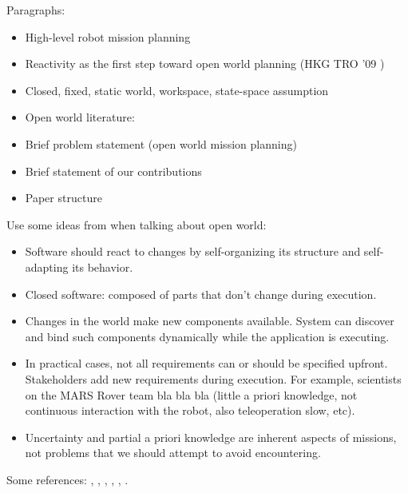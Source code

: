 Paragraphs:
\begin{itemize}
	\item High-level robot mission planning
	\item Reactivity as the first step toward open world planning (HKG TRO '09 \cite{KGFP_TRO09})
  	\item Closed, fixed, static world, workspace, state-space assumption
 	\item Open world literature: \cite{MatthiasAI2010}
	\item Brief problem statement (open world mission planning)
   	\item Brief statement of our contributions
   	\item Paper structure
\end{itemize}

Use some ideas from \cite{open-world-sw} when talking about open world:
\begin{itemize}
	\item Software should react to changes by self-organizing its structure and self-adapting its behavior.
	\item Closed software: composed of parts that don't change during execution.
	\item Changes in the world make new components available. System can discover and bind such components dynamically while the application is executing.
	\item In practical cases, not all requirements can or should be specified upfront. Stakeholders add new requirements during execution. For example, scientists on the MARS Rover team bla bla bla (little a priori knowledge, not continuous interaction with the robot, also teleoperation slow, etc).
	\item Uncertainty and partial a priori knowledge are inherent aspects of missions, not problems that we should attempt to avoid encountering.
\end{itemize}

Some references: \cite{MurrayICRA2012}, \cite{MurrayICRA2013a},  \cite{BeltaICRA2012}, \cite{Dimos2013ICRA}, \cite{Belta2013RSS}, \cite{BingxinRSS2012}.